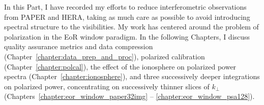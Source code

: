 In this Part, I have recorded my efforts to reduce interferometric observations from PAPER and HERA, taking as much care as possible to avoid introducing spectral structure to the visibilities. My work has centered around the problem of polarization in the EoR window paradigm. In the following Chapters, I discuss quality assurance metrics and data compression (Chapter~\ref{chapter:data_prep_and_proc}), polarized calibration (Chapter~\ref{chapter:polcal}), the effect of the ionosphere on polarized power spectra (Chapter~\ref{chapter:ionosphere}), and three successively deeper integrations on polarized power, concentrating on successively thinner slices of $k_{\perp}$ (Chapters~\ref{chapter:eor_window_paper32img} -- \ref{chapter:eor_window_psa128}).